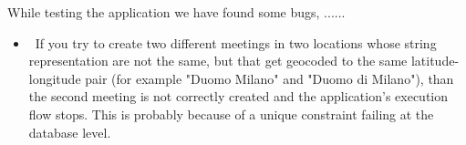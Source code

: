 While testing the application we have found some bugs, ......

\begin{itemize}
	\item~If you try to create two different meetings in two locations whose string representation are not the same, but that get geocoded to the same latitude-longitude pair (for example "Duomo Milano" and "Duomo di Milano"), than the second meeting is not correctly created and the application's execution flow stops. This is probably because of a unique constraint failing at the database level.
\end{itemize}